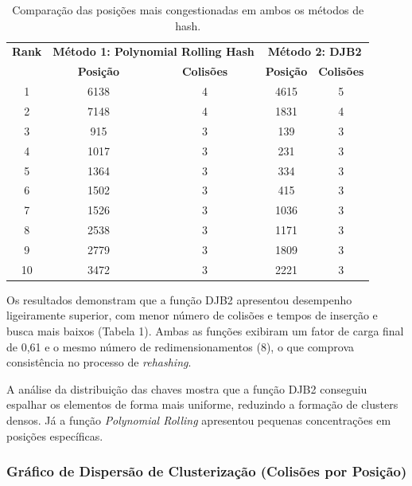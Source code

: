 \documentclass[12pt,a4paper]{abntex2}
\begin{document}
\begin{table}[h!]
\caption{Comparação das posições mais congestionadas em ambos os métodos de hash. }
\centering
\begin{tabular}{c|cc|cc}
\toprule
\textbf{Rank} & \multicolumn{2}{c|}{\textbf{Método 1: Polynomial Rolling Hash}} & \multicolumn{2}{c}{\textbf{Método 2: DJB2}} \\
\cmidrule(lr){2-3} \cmidrule(lr){4-5}
& \textbf{Posição} & \textbf{Colisões} & \textbf{Posição} & \textbf{Colisões} \\
\midrule
1  & 6138 & 4 & 4615 & 5 \\
2  & 7148 & 4 & 1831 & 4 \\
3  & 915  & 3 & 139  & 3 \\
4  & 1017 & 3 & 231  & 3 \\
5  & 1364 & 3 & 334  & 3 \\
6  & 1502 & 3 & 415  & 3 \\
7  & 1526 & 3 & 1036 & 3 \\
8  & 2538 & 3 & 1171 & 3 \\
9  & 2779 & 3 & 1809 & 3 \\
10 & 3472 & 3 & 2221 & 3 \\
\bottomrule
\end{tabular}
\end{table}

Os resultados demonstram que a função DJB2 apresentou desempenho ligeiramente superior, com menor número de colisões e tempos de inserção e busca mais baixos (Tabela 1). Ambas as funções exibiram um fator de carga final de 0,61 e o mesmo número de redimensionamentos (8), o que comprova consistência no processo de \textit{rehashing}.

A análise da distribuição das chaves mostra que a função DJB2 conseguiu espalhar os elementos de forma mais uniforme, reduzindo a formação de clusters densos. Já a função \textit{Polynomial Rolling} apresentou pequenas concentrações em posições específicas.

\subsubsection{Gráfico de Dispersão de Clusterização (Colisões por Posição)}
\end{document}
